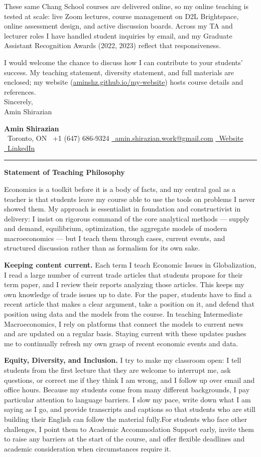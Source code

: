 \documentclass[10.5pt]{article}
\makeatletter
\newcommand{\headingfont}{\sffamily}
\newcommand{\nameblock}{%
	{\headingfont\LARGE\bfseries Amin Shirazian}\\[2pt]
	\faMapMarker*\ Toronto, ON \;\textbar\; \faPhone\ +1 (647) 686-9324 \;\textbar\; \href{mailto:amin.shirazian.work@gmail.com}{\faEnvelope\ amin.shirazian.work@gmail.com} \;\textbar\; \href{https://aminshz.github.io/my-website/}{\faGlobe\ Website} \;\textbar\; \href{https://linkedin.com/in/amin-shirazian}{\faLinkedin\ LinkedIn}\\[-4pt]
	\rule{\textwidth}{1pt}}
\makeatother
\begin{document}
	These same Chang School courses are delivered online, so my online teaching is tested at scale: live Zoom lectures, course management on D2L Brightspace, online assessment design, and active discussion boards. Across my TA and lecturer roles I have handled student inquiries by email, and my Graduate Assistant Recognition Awards (2022, 2023) reflect that responsiveness.   
	
	I would welcome the chance to discuss how I can contribute to your students' success. My teaching statement, diversity statement, and full materials are enclosed; my website (\href{https://aminshz.github.io/my-website/}{aminshz.github.io/my-website}) hosts course details and references.\\
	
	Sincerely,\\[4pt]
	Amin Shirazian
	
	\newpage
	\nameblock
	\begin{center}{\headingfont\Large\bfseries Statement of Teaching Philosophy}\end{center}
	
	Economics is a toolkit before it is a body of facts, and my central goal as a teacher is that students leave my course able to use the tools on problems I never showed them. My approach is essentialist in foundation and constructivist in delivery: I insist on rigorous command of the core analytical methods --- supply and demand, equilibrium, optimization, the aggregate models of modern macroeconomics --- but I teach them through cases, current events, and structured discussion rather than as formalism for its own sake.
	
	\textbf{Keeping content current.} Each term I teach Economic Issues in Globalization, I read a large number of current trade articles that students propose for their term paper, and I review their reports analyzing those articles. This keeps my own knowledge of trade issues up to date. For the paper, students have to find a recent article that makes a clear argument, take a position on it, and defend that position using data and the models from the course. In teaching Intermediate Macroeconomics, I rely on platforms that connect the models to current news and are updated on a regular basis. Staying current with these updates pushes me to continually refresh my own grasp of recent economic events and data.

	\textbf{Equity, Diversity, and Inclusion.}  I try to make my classroom open: I tell students from the first lecture that they are welcome to interrupt me, ask questions, or correct me if they think I am wrong, and I follow up over email and office hours. Because my students come from many different backgrounds, I pay particular attention to language barriers. I slow my pace, write down what I am saying as I go, and provide transcripts and captions so that students who are still building their English can follow the material fully.For students who face other challenges, I point them to Academic Accommodation Support early, invite them to raise any barriers at the start of the course, and offer flexible deadlines and academic consideration when circumstances require it.
	
\end{document}

